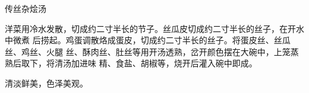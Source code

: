 %
%
%
%
%
%
%
\begin{recipe}{传丝杂烩汤}

\ingredients


\preparation

洋菜用冷水发散，切成约二寸半长的节子。丝瓜皮切成约二寸半长的丝子，在开水中微煮
后捞起。鸡蛋调散烙成蛋皮，切成约二寸半长的丝子。将蛋皮丝、丝瓜丝、鸡丝、火腿
丝、酥肉丝、肚丝等用开汤透熟，岔开颜色摆在大碗中，上笼蒸熟后取下，将清汤加进味
精、食盐、胡椒等，烧开后灌入碗中即成。

\features

清淡鲜美，色泽美观。

\end{recipe}

